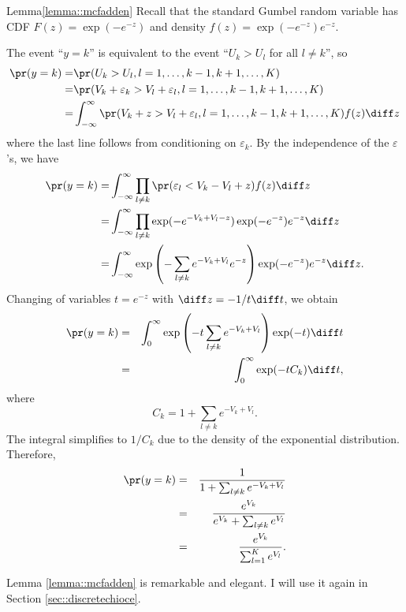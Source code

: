 \begin{myproof}{Lemma}{\ref{lemma::mcfadden}}
Recall that the standard Gumbel random variable has 
CDF
$
F(z)=\exp(-e^{-z})
$
and density
$
f(z)=\exp(-e^{-z})e^{-z} . 
$


The event ``$y=k$'' is equivalent to the event ``$U_{k}>U_{l}$
for all $l\neq k$'', so
\begin{align*}
\pr(y  =k)=& \pr(U_{k}>U_{l},l=1,\ldots,k-1,k+1,\ldots,K)\\
= & \pr(V_{k}+\varepsilon_{k}>V_{l}+\varepsilon_{l},l=1,\ldots,k-1,k+1,\ldots,K)\\
= & \int_{-\infty}^{\infty}\pr(V_{k}+z>V_{l}+\varepsilon_{l},l=1,\ldots,k-1,k+1,\ldots,K)f(z) \diff z
\end{align*}
where the last line follows from conditioning on $\varepsilon_k$. By the independence of the $\varepsilon$'s, we have
\begin{align*}
\pr(y  =k)= & \int_{-\infty}^{\infty}\prod_{l\neq k}\pr(\varepsilon_{l}<V_{k}-V_{l}+z)f(z) \diff z\\
= & \int_{-\infty}^{\infty}\prod_{l\neq k}\exp(-e^{-V_{k}+V_{l}-z})\exp(-e^{-z})e^{-z}  \diff z\\
= & \int_{-\infty}^{\infty}\exp\left(-\sum_{l\neq k}e^{-V_{k}+V_{l}}e^{-z} \right)\exp(-e^{-z})e^{-z} \diff z.
\end{align*}
Changing of variables $t=e^{-z}$ with $\diff z=-1/t \diff t$, we obtain
\begin{eqnarray*}
\pr(y  =k) 
&=&\int_{0}^{\infty}\exp \left(-t\sum_{l\neq k}e^{-V_{k}+V_{l}} \right)\exp(-t)\diff t  \\
&=&\int_{0}^{\infty}\exp(-tC_{k})\diff t , 
\end{eqnarray*}
where
\[
C_{k}=1+\sum_{l\neq k}e^{-V_{k}+V_{l}}.
\]
The integral simplifies to $1/C_{k}$ due to the density of the exponential
distribution. Therefore,
\begin{eqnarray*}
\pr(y=k)  
&=&  \frac{1}{1+\sum_{l\neq k}e^{-V_{k}+V_{l}}}\\
&=&\frac{e^{V_{k}}}{e^{V_{k}}+\sum_{l\neq k}e^{V_{l}}} \\
&=&\frac{e^{V_{k}}}{\sum_{l=1}^{K}e^{V_{l}}}.
\end{eqnarray*}
\end{myproof}


Lemma \ref{lemma::mcfadden} is remarkable and elegant. 
I will use it again in Section \ref{sec::discretechioce}. 



